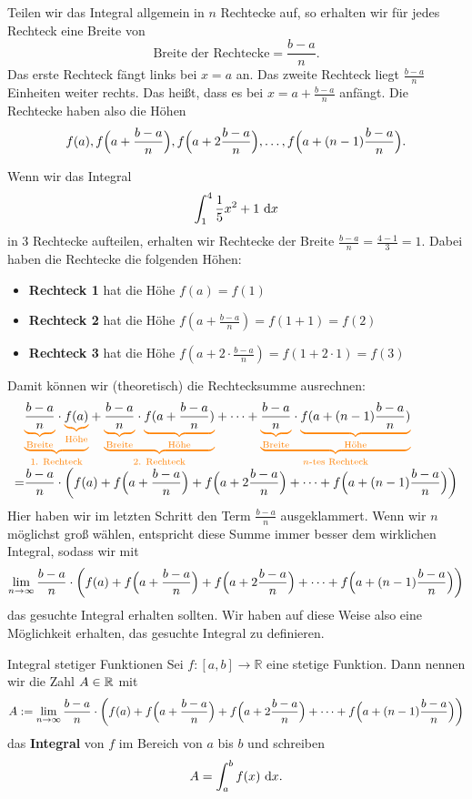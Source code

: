 \documentclass[../../main.tex]{subfiles}
\begin{document}
Teilen wir das Integral allgemein in $n$ Rechtecke auf, so erhalten wir für jedes Rechteck eine Breite von
\[\text{Breite der Rechtecke}=\frac{b-a}{n}.\]
Das erste Rechteck fängt links bei $x=a$ an. Das zweite Rechteck liegt $\frac{b-a}{n}$ Einheiten weiter rechts. Das
heißt, dass es bei $x=a+\frac{b-a}{n}$ anfängt. Die Rechtecke haben also die Höhen
\[f(a), f\Bigl(a+\frac{b-a}{n}\Bigr), f\Bigl(a+2\frac{b-a}{n}\Bigr),\dots,f\Bigl(a+(n-1)\frac{b-a}{n}\Bigr).\]
\begin{example}{}
    Wenn wir das Integral
    \[\int_1^4\frac{1}{5}x^2+1\mathop{}\mathrm{d} x\]
    in 3 Rechtecke aufteilen, erhalten wir Rechtecke der Breite $\frac{b-a}{n}=\frac{4-1}{3}=1$. Dabei haben die
    Rechtecke die folgenden Höhen:
    \begin{itemize}
        \item \textbf{Rechteck 1} hat die Höhe $f(a)=f(1)$
        \item \textbf{Rechteck 2} hat die Höhe $f(a+\frac{b-a}{n})=f(1+1)=f(2)$
        \item \textbf{Rechteck 3} hat die Höhe $f(a+2\cdot\frac{b-a}{n})=f(1+2\cdot 1)=f(3)$
    \end{itemize}
\end{example}

Damit können wir (theoretisch) die Rechtecksumme ausrechnen:
\begin{align*}
    &\colorbrace{\colorbrace{\frac{b-a}{n}}{\text{Breite}}\cdot \colorbrace{f(a)}{\text{Höhe}}}{\text{1. Rechteck}}+
    \colorbrace{\colorbrace{\frac{b-a}{n}}{\text{Breite}}\cdot \colorbrace{f(a+\frac{b-a}{n})}{\text{Höhe}}}{\text{2. Rechteck}}+
    \dots+
    \colorbrace{\colorbrace{\frac{b-a}{n}}{\text{Breite}}\cdot \colorbrace{f(a+(n-1)\frac{b-a}{n})}{\text{Höhe}}}{n\text{-tes Rechteck}}\\
    =&\frac{b-a}{n}\cdot \biggl(f(a)+f\Bigl(a+\frac{b-a}{n}\Bigr)+f\Bigl(a+2\frac{b-a}{n}\Bigr)+\dots+f\Bigl(a+(n-1)\frac{b-a}{n}\Bigr)\biggr)
\end{align*}
Hier haben wir im letzten Schritt den Term $\frac{b-a}{n}$ ausgeklammert. Wenn wir $n$ möglichst groß wählen, entspricht diese Summe immer 
besser dem wirklichen Integral, sodass wir mit
\[\lim_{n\rightarrow\infty}\frac{b-a}{n}\cdot \biggl(f(a)+f\Bigl(a+\frac{b-a}{n}\Bigr)+f\Bigl(a+2\frac{b-a}{n}\Bigr)+\dots+f\Bigl(a+(n-1)\frac{b-a}{n}\Bigr)\biggr)\]
das gesuchte Integral erhalten sollten. Wir haben auf diese Weise also eine Möglichkeit erhalten, das gesuchte Integral
zu definieren.

\begin{definition}{Integral stetiger Funktionen}
    Sei $f:[a,b]\rightarrow\mathbb{R}$ eine stetige Funktion. Dann nennen wir die Zahl $A\in\mathbb{R}$ mit
    \[A:=\lim_{n\rightarrow\infty}\frac{b-a}{n}\cdot \biggl(f(a)+f\Bigl(a+\frac{b-a}{n}\Bigr)+f\Bigl(a+2\frac{b-a}{n}\Bigr)+\dots+f\Bigl(a+(n-1)\frac{b-a}{n}\Bigr)\biggr)\]
    das \textbf{Integral} von $f$ im Bereich von $a$ bis $b$ und schreiben
    \[A=\int_a^bf(x)\mathop{}\mathrm{d} x.\]
\end{definition}
\end{document}
